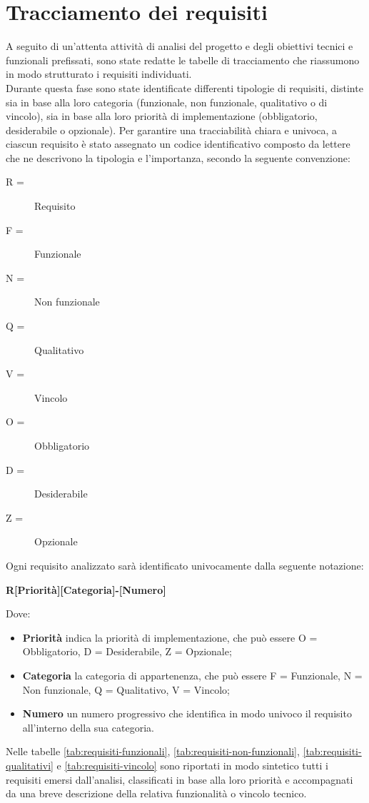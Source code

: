 \section{Tracciamento dei requisiti}

A seguito di un'attenta attività di analisi del progetto e degli obiettivi tecnici e funzionali prefissati, sono state redatte le tabelle di tracciamento che riassumono in modo strutturato i requisiti individuati. \\
Durante questa fase sono state identificate differenti tipologie di requisiti, distinte sia in base alla loro categoria (funzionale, non funzionale, qualitativo o di vincolo), sia in base alla loro priorità di implementazione (obbligatorio, desiderabile o opzionale).
Per garantire una tracciabilità chiara e univoca, a ciascun requisito è stato assegnato un codice identificativo composto da lettere che ne descrivono la tipologia e l'importanza, secondo la seguente convenzione:
\begin{description}
	\item [R =] Requisito
	\item [F =] Funzionale
    \item [N =] Non funzionale
    \item [Q =] Qualitativo
    \item [V =] Vincolo
    \item [O =] Obbligatorio
    \item [D =] Desiderabile
    \item [Z =] Opzionale
\end{description}

\newpage

Ogni requisito analizzato sarà identificato univocamente dalla seguente notazione:
\begin{center}
    \textbf{R[Priorità][Categoria]-[Numero]}
\end{center}
Dove:

\begin{itemize}
    \item \textbf{Priorità} indica la priorità di implementazione, che può essere O = Obbligatorio, D = Desiderabile, Z = Opzionale;
    \item \textbf{Categoria} la categoria di appartenenza, che può essere F = Funzionale, N = Non funzionale, Q = Qualitativo, V = Vincolo;
    \item \textbf{Numero} un numero progressivo che identifica in modo univoco il requisito all'interno della sua categoria.
\end{itemize}
Nelle tabelle \ref{tab:requisiti-funzionali}, \ref{tab:requisiti-non-funzionali}, \ref{tab:requisiti-qualitativi} e \ref{tab:requisiti-vincolo} sono riportati in modo sintetico tutti i requisiti emersi dall'analisi, classificati in base alla loro priorità e accompagnati da una breve descrizione della relativa funzionalità o vincolo tecnico. \\


